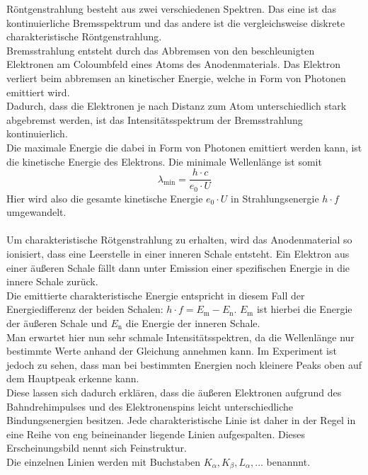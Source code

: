 Röntgenstrahlung besteht aus zwei verschiedenen Spektren. Das 
eine ist das kontinuierliche Bremsspektrum und das andere ist die
vergleichsweise diskrete charakteristische Röntgenstrahlung.\\
Bremsstrahlung entsteht durch das Abbremsen von den beschleunigten
Elektronen am Coloumbfeld eines Atoms des Anodenmaterials. Das Elektron
verliert beim abbremsen an kinetischer Energie, welche in Form von Photonen
emittiert wird.\\
Dadurch, dass die Elektronen je nach Distanz zum Atom unterschiedlich stark
abgebremst werden, ist das Intensitätsspektrum der Bremsstrahlung
kontinuierlich.\\
Die maximale Energie die dabei in Form von Photonen emittiert werden kann, ist die
kinetische Energie des Elektrons. Die minimale Wellenlänge ist somit
\begin{equation}
    \label{eqn:Energiedifferenz}
    \lambda_{\mathrm{min}} = \frac{h\cdot c}{e_0 \cdot U}
\end{equation}
Hier wird also die gesamte kinetische Energie $e_0 \cdot U$ in Strahlungsenergie $h \cdot f$
umgewandelt.\\
\\
Um charakteristische Rötgenstrahlung zu erhalten, wird das Anodenmaterial so ionisiert,
dass eine Leerstelle in einer inneren Schale entsteht. Ein Elektron aus einer äußeren
Schale fällt dann unter Emission einer spezifischen Energie in die innere Schale zurück.\\
Die emittierte charakteristische Energie entspricht in diesem Fall der Energiedifferenz
der beiden Schalen: $h \cdot f = E_{\mathrm{m}} - E_{\mathrm{n}}$. $E_{\mathrm{m}}$ ist hierbei
die Energie der äußeren Schale und $E_{\mathrm{n}}$ die Energie der inneren Schale.\\
Man erwartet hier nun sehr schmale Intensitätsspektren, da die Wellenlänge nur bestimmte
Werte anhand der Gleichung annehmen kann. Im Experiment ist jedoch zu sehen, dass man
bei bestimmten Energien noch kleinere Peaks oben auf dem Hauptpeak erkenne kann.\\
Diese lassen sich dadurch erklären, dass die äußeren Elektronen aufgrund des Bahndrehimpulses
und des Elektronenspins leicht unterschiedliche Bindungsenergien besitzen. Jede charakteristische
Linie ist daher in der Regel in eine Reihe von eng beineinander liegende Linien aufgespalten.
Dieses Erscheinungsbild nennt sich Feinstruktur.\\
Die einzelnen Linien werden mit Buchstaben $K_{\alpha}, K_{\beta}, L_{\alpha}, ...$ benannnt. 
